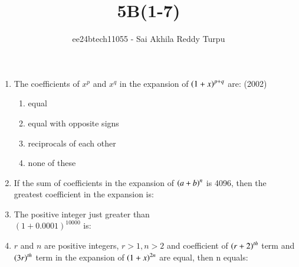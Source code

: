 \documentclass[journal,12pt,twocolumn]{IEEEtran}
\theoremstyle{remark}
\begin{document}

\vspace{3cm}

\title{5B(1-7)}
\author{ee24btech11055 - Sai Akhila Reddy Turpu}
\maketitle
\newpage
\bigskip

\renewcommand{\thefigure}{\theenumi}
\renewcommand{\thetable}{\theenumi}
\begin{enumerate}
	\item The coefficients of $x^p$ and $x^q$ in the expansion of $\left(1+x\right)^{p+q}$ are:
	\hfill{(2002)}
	\begin{enumerate}[label=(\alph*)]
		\item equal
		\item equal with opposite signs
		\item reciprocals of each other
		\item none of these
	\end{enumerate}
\item If the sum of coefficients in the expansion of $\left(a+b\right)^n$ is 4096, then the greatest coefficient in the expansion is:  
	\hfill{}
	\begin{enumerate}[label=(\alph*)]
	\end{enumerate}
\item The positive integer just greater than \\
$(1+0.0001)^{10000}$ is: 
		\hfill{}
	\begin{enumerate}[label=(\alph*)]
	\end{enumerate}
\item $r$ and $n$ are positive integers, $r>1, n>2$ and coefficient of $\left(r+2\right)^{th}$ term and $\left(3r\right)^{th}$ term in the expansion of $\left(1+x\right)^{2n}$ are equal, then n equals:


\end{enumerate}
\end{document}
